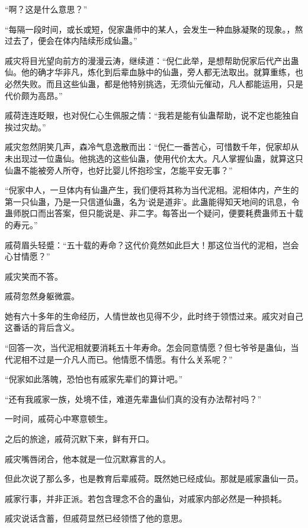 
\begin{this_body}

“啊？这是什么意思？”

“每隔一段时间，或长或短，倪家蛊师中的某人，会发生一种血脉凝聚的现象。，熬过去了，便会在体内陆续形成仙蛊。”

戚灾将目光望向前方的漫漫云涛，继续道：“倪仁此举，是想帮助倪家后代产出蛊仙。他的确才华非凡，炼化到后辈血脉中的仙蛊，旁人都无法取出。就算重练，也必然失败。而且这些仙蛊，都是他特别挑选，无须仙元催动，凡人都能运用，只是代价颇为高昂。”

戚荷连连眨眼，也对倪仁心生佩服之情：“我若是能有仙蛊帮助，说不定也能独自挨过灾劫。”

戚灾忽然阴笑几声，森冷气息逸散而出：“倪仁一番苦心，可惜数千年，倪家却从未出现过一位蛊仙。他挑选的这些仙蛊，使用代价太大。凡人掌握仙蛊，就算这只仙蛊不能被旁人所夺，也好比婴儿怀抱珍宝，怎能平安无事？”

“倪家中人，一旦体内有仙蛊产生，我们便将其称为当代泥相。泥相体内，产生的第一只仙蛊，乃是一只信道仙蛊，名为‘说是道非’。此蛊能得知天地间的讯息，令蛊师脱口而出答案，但只能说是、非二字。每答出一个疑问，便要耗费蛊师五十载的寿元。”

戚荷眉头轻蹙：“五十载的寿命？这代价竟然如此巨大！那这位当代的泥相，岂会心甘情愿？”

戚灾笑而不答。

戚荷忽然身躯微震。

她有六十多年的生命经历，人情世故也见得不少，此时终于领悟过来。戚灾对自己这番话的背后含义。

“回答一次，当代泥相就要消耗五十年寿命。怎会同意情愿？但七爷爷是蛊仙，当代泥相不过是一介凡人而已。他情愿不情愿。有什么关系呢？”

“倪家如此落魄，恐怕也有戚家先辈们的算计吧。”

“还有我戚家一族，处境不佳，难道先辈蛊仙们真的没有办法帮衬吗？”

一时间，戚荷心中寒意顿生。

之后的旅途，戚荷沉默下来，鲜有开口。

戚灾嘴唇闭合，他本就是一位沉默寡言的人。

但此次说了那么多，也是教育后辈戚荷。既然她已经成仙。那就是戚家蛊仙一员。

戚家行事，并非正派。若包含理念不合的蛊仙，对戚家内部必然是一种损耗。

戚灾说话含蓄，但戚荷显然已经领悟了他的意思。


\end{this_body}
